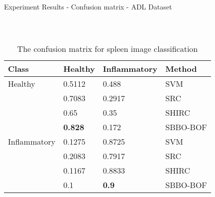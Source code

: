 \documentclass [9pt,times] {beamer}
\begin{document}
\begin{frame}{Experiment Results - Confusion matrix - ADL Dataset}
\begin{columns}
\begin{column}{5cm}
\begin{table}
{\begin{tabular}{|p{0.4in}|p{0.3in}|p{0.4in}|p{0.45in}|}
\hline
 \end{tabular}}
\end{table}
\end{column}
\end{columns}

\begin{table}

\scriptsize
    \caption{The confusion matrix for spleen image classification}
    \label{tab:cm_spl}
{\renewcommand{\arraystretch}{1}    
\begin{tabular}{|p{0.4in}|p{0.3in}|p{0.4in}|p{0.45in}|}

    \hline
Class    &    Healthy    &    Inflammatory    &    Method    \\
\hline
Healthy    &    0.5112    &    0.488    &    SVM    \\
    &    0.7083    &    0.2917    &    SRC    \\
    &    0.65    &    0.35    &    SHIRC    \\
    &\textbf{    0.828    }&    0.172    &    SBBO-BOF    \\
\hline
Inflammatory    &    0.1275    &    0.8725    &    SVM    \\
    &    0.2083    &    0.7917    &    SRC    \\
    &    0.1167    &    0.8833    &    SHIRC    \\
    &    0.1    &\textbf{    0.9    }&    SBBO-BOF    \\


\hline
 \end{tabular}}
\end{table}


\end{frame}
\end{document}
